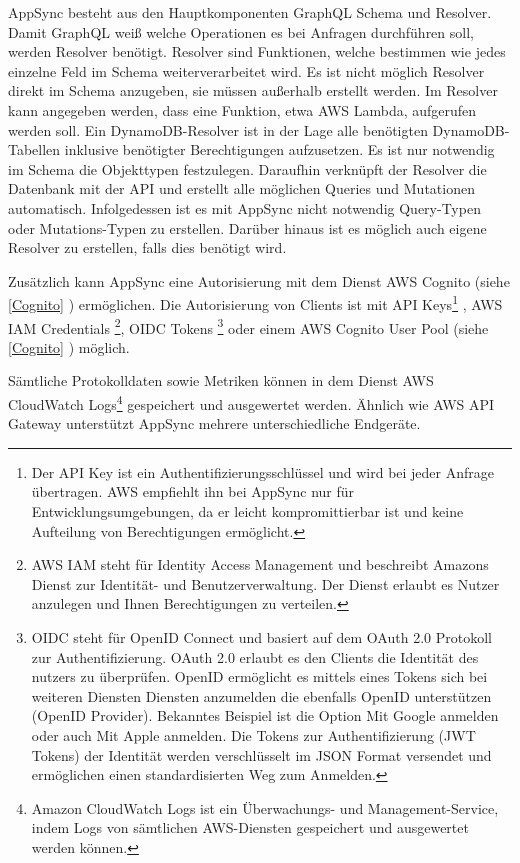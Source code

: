 AppSync besteht aus den Hauptkomponenten GraphQL Schema und Resolver.
Damit GraphQL weiß welche Operationen es bei Anfragen durchführen soll, werden Resolver benötigt.
Resolver sind Funktionen, welche bestimmen wie jedes einzelne Feld im Schema weiterverarbeitet wird.
Es ist nicht möglich Resolver direkt im Schema anzugeben, sie müssen außerhalb erstellt werden.
Im Resolver kann angegeben werden, dass eine Funktion, etwa AWS Lambda, aufgerufen werden soll.
Ein DynamoDB-Resolver ist in der Lage alle benötigten DynamoDB-Tabellen inklusive benötigter Berechtigungen aufzusetzen.
Es ist nur notwendig im Schema die Objekttypen festzulegen.
Daraufhin verknüpft der Resolver die Datenbank mit der API und erstellt alle möglichen Queries und Mutationen automatisch.
Infolgedessen ist es mit AppSync nicht notwendig Query-Typen oder Mutations-Typen zu erstellen.
Darüber hinaus ist es möglich auch eigene Resolver zu erstellen, falls dies benötigt wird.

Zusätzlich kann AppSync eine Autorisierung mit dem Dienst AWS Cognito (siehe \ref{Cognito} ) ermöglichen.
Die Autorisierung von Clients ist mit API Keys\footnote{Der API Key ist ein Authentifizierungsschlüssel und wird bei jeder Anfrage übertragen. AWS empfiehlt ihn bei AppSync nur für Entwicklungsumgebungen,
da er leicht kompromittierbar ist und keine Aufteilung von Berechtigungen ermöglicht.}
, AWS IAM Credentials \footnote{
    AWS IAM steht für Identity Access Management und beschreibt Amazons Dienst zur Identität- und Benutzerverwaltung. Der Dienst erlaubt es Nutzer anzulegen und
    Ihnen Berechtigungen zu verteilen.},
    OIDC Tokens \footnote{OIDC steht für OpenID Connect und basiert auf dem OAuth 2.0 Protokoll zur Authentifizierung.
    OAuth 2.0 erlaubt es den Clients die Identität des nutzers zu überprüfen.
    OpenID ermöglicht es mittels eines Tokens sich bei weiteren Diensten Diensten anzumelden die ebenfalls OpenID unterstützen (OpenID Provider).
    Bekanntes Beispiel ist die Option \glqq Mit Google anmelden\grqq{} oder auch \glqq Mit Apple anmelden\grqq.
    Die Tokens zur Authentifizierung (JWT Tokens) der Identität werden verschlüsselt im JSON Format versendet und ermöglichen einen standardisierten Weg zum Anmelden.

          } oder einem AWS
Cognito User Pool (siehe \ref{Cognito} ) möglich. \cite[]{AppSyncAuth}

Sämtliche Protokolldaten sowie Metriken können in dem Dienst AWS CloudWatch Logs\footnote{ Amazon CloudWatch Logs ist ein Überwachungs- und Management-Service, indem Logs von sämtlichen AWS-Diensten gespeichert und ausgewertet werden können. } gespeichert und ausgewertet werden.
Ähnlich wie AWS API Gateway unterstützt AppSync mehrere unterschiedliche Endgeräte.

